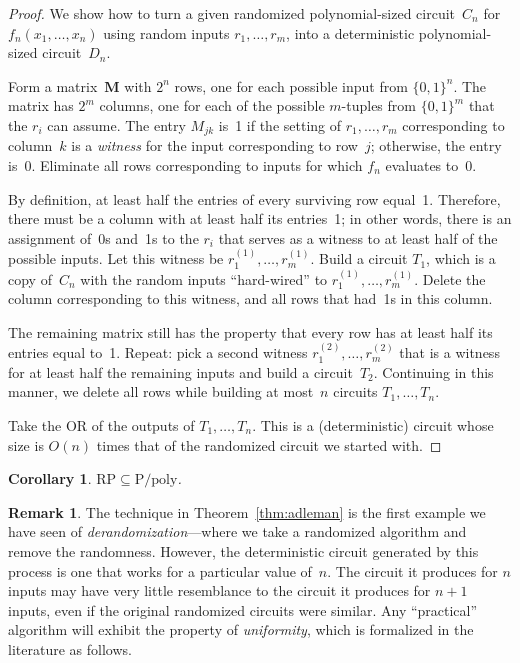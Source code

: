 \documentclass[twoside,12pt]{book}
\theoremstyle{plain}
\newtheorem{corollary}[theorem]{Corollary}
\theoremstyle{definition}
\newtheorem{remark}[theorem]{Remark}
\theoremstyle{remark}
\begin{document}
\begin{proof}
We show how to turn a given randomized polynomial-sized circuit~$C_n$ for
$f_n(x_1,\ldots,x_n)$ using random inputs $r_1,\ldots,r_m$, into a
deterministic polynomial-sized circuit~$D_n$.

Form a matrix~$\mathbf{M}$ with $2^n$ rows, one for each possible input from
$\{0,1\}^n$.  The matrix has $2^m$ columns, one for each of the possible
$m$-tuples from $\{0,1\}^m$ that the $r_i$ can assume.  The entry $M_{jk}$
is~1 if the setting of $r_1,\ldots,r_m$ corresponding to column~$k$ is a
\emph{witness} for the input corresponding to row~$j$; otherwise, the entry
is~0.  Eliminate all rows corresponding to inputs for which $f_n$ evaluates
to~0.

By definition, at least half the entries of every surviving row equal~1.
Therefore, there must be a column with at least half its entries~1; in other
words, there is an assignment of~0s and~1s to the $r_i$ that serves as a
witness to at least half of the possible inputs.  Let this witness be
$r_1^{(1)},\ldots,r_m^{(1)}$.  Build a circuit $T_1$, which is a copy
of~$C_n$ with the random inputs ``hard-wired'' to
$r_1^{(1)},\ldots,r_m^{(1)}$.  Delete the column corresponding to this
witness, and all rows that had~1s in this column.

The remaining matrix still has the property that every row has at least half
its entries equal to~1.  Repeat: pick a second witness
$r_1^{(2)},\ldots,r_m^{(2)}$ that is a witness for at least half the
remaining inputs and build a circuit~$T_2$.  Continuing in this manner, we
delete all rows while building at most~$n$ circuits $T_1,\ldots,T_n$.

Take the OR of the outputs of $T_1,\ldots,T_n$.  This is a (deterministic)
circuit whose size is $O(n)$ times that of the randomized circuit we started
with.
\end{proof}

\begin{corollary}
$\mathrm{RP}\subseteq\mathrm{P/poly}$.
\end{corollary}

\begin{remark}
The technique in Theorem~\ref{thm:adleman} is the first example we have seen
of \emph{derandomization}---where we take a randomized algorithm and remove
the randomness.  However, the deterministic circuit generated by this process
is one that works for a particular value of~$n$.  The circuit it produces for
$n$ inputs may have very little resemblance to the circuit it produces for
$n+1$ inputs, even if the original randomized circuits were similar.  Any
``practical'' algorithm will exhibit the property of \emph{uniformity}, which
is formalized in the literature as follows.
\end{remark}
\end{document}
